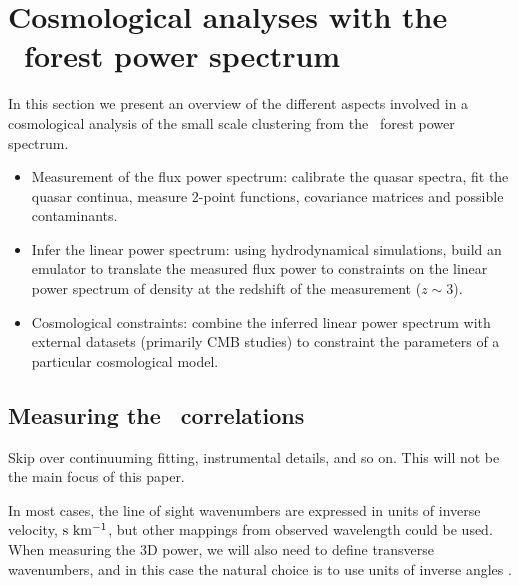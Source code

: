 \section{Cosmological analyses with the \lya\ forest power spectrum}
\label{sec:over}

In this section we present an overview of the different aspects involved in 
a cosmological analysis of the small scale clustering from the \lya\ forest
power spectrum.

\begin{itemize}
 \item Measurement of the flux power spectrum: calibrate the quasar spectra, 
  fit the quasar continua, measure 2-point functions, covariance matrices 
  and possible contaminants.
 \item Infer the linear power spectrum: using hydrodynamical simulations, 
  build an emulator to translate the measured flux power to constraints 
  on the linear power spectrum of density at the redshift of the measurement
  ($z \sim 3$).
 \item Cosmological constraints: combine the inferred linear power spectrum
  with external datasets (primarily CMB studies) to constraint the parameters
  of a particular cosmological model.
\end{itemize}


\subsection{Measuring the \lya\ correlations}

Skip over continuuming fitting, instrumental details, and so on.
This will not be the main focus of this paper.

In most cases, the line of sight wavenumbers are expressed in units of 
inverse velocity, ${\rm s~km^{-1}}$, but other mappings from observed wavelength 
could be used.
When measuring the 3D power, we will also need to define transverse 
wavenumbers, and in this case the natural choice is to use units of 
inverse angles \cite{Font-Ribera2018}.

